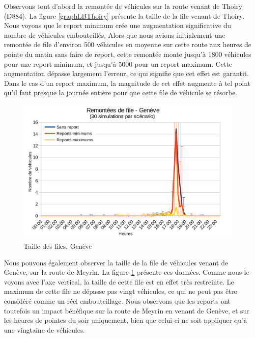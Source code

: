 \documentclass[a4paper,11pt, titlepage]{extarticle}
\begin{document}
Observons tout d'abord la remontée de véhicules sur la route venant de Thoiry (D884). La figure \ref{graphLBThoiry} présente la taille de la file venant de Thoiry. Nous voyons que le report minimum crée une augmentation significative du nombre de véhicules embouteillés. Alors que nous avions initialement une remontée de file d'environ 500 véhicules en moyenne sur cette route aux heures de pointe du matin sans faire de report, cette remontée monte jusqu'à 1800 véhicules pour une report minimum, et jusqu'à 5000 pour un report maximum. Cette augmentation dépasse largement l'erreur, ce qui signifie que cet effet est garantit. Dans le cas d'un report maximum, la magnitude de cet effet augmente à tel point qu'il faut presque la journée entière pour que cette file de véhicule se résorbe. 

\begin{figure}[!h]
  \begin{center}
    \includegraphics[width=12cm]{graphiques/leakyB_geneve_s1.png}
  \end{center}
  \vspace{-0.8cm}
  \caption{Taille des files, Genève}
  \label{graphLBGeneve}
\end{figure}

Nous pouvons également observer la taille de la file de véhicules venant de Genève, sur la route de Meyrin. La figure \ref{graphLBGeneve} présente ces données. Comme nous le voyons avec l'axe vertical, la taille de cette file est en effet très restreinte. Le maximum de cette file ne dépasse pas vingt véhicules, ce qui ne peut pas être considéré comme un réel embouteillage. Nous observons que les reports ont toutefois un impact bénéfique sur la route de Meyrin en venant de Genève, et sur les heures de pointes du soir uniquement, bien que celui-ci ne soit appliquer qu'à une vingtaine de véhicules.
\end{document}
